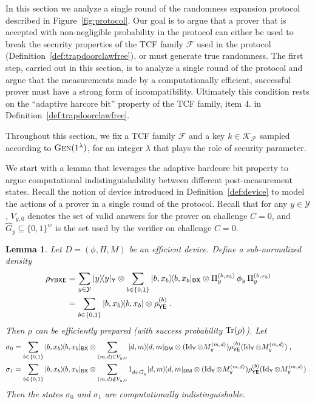 \documentclass[11pt]{article}
\newtheorem{lemma}[theorem]{Lemma}
\theoremstyle{remark}
\theoremstyle{definition}
\newcommand{\ket}[1]{|#1\rangle}
\newcommand{\bra}[1]{\langle#1|}
\newcommand{\proj}[1]{\ket{#1}\!\bra{#1}}
\newcommand{\Tr}{\mbox{\rm Tr}}
\newcommand{\Id}{\ensuremath{\mathop{\rm Id}\nolimits}}
\newcommand{\reg}[1]{{\textsf{#1}}}
\newcommand{\mF}{\ensuremath{\mathcal{F}}}
\newcommand{\mK}{\ensuremath{\mathcal{K}}}
\newcommand{\mY}{\ensuremath{\mathcal{Y}}}
\newcommand{\dset}{G}
\newcommand{\Gen}{\textsc{Gen}}
\begin{document}
In this section we analyze a single round of the randomness expansion protocol described in Figure~\ref{fig:protocol}. Our goal is to argue that a prover that is accepted with non-negligible probability in the protocol can either be used to break the security properties of the TCF family $\mathcal{F}$ used in the protocol (Definition~\ref{def:trapdoorclawfree}), or must generate true randomness. The first step, carried out in this section, is to analyze a single round of the protocol and argue that the measurements made by a computationally efficient, successful prover must have a strong form of incompatibility. Ultimately this condition rests on the ``adaptive harcore bit'' property of the TCF family, item 4. in Definition~\ref{def:trapdoorclawfree}. 

Throughout this section, we fix a TCF family $\mathcal{F}$ and a key $k\in \mK_\mF$ sampled according to $\Gen(1^\lambda)$, for an integer $\lambda$ that plays the role of security parameter. 

We start with a lemma that leverages the adaptive hardcore bit property to argue computational indistinguishability between different post-measurement states. Recall the notion of device introduced in Definition~\ref{def:device} to model the actions of a prover in a single round of the protocol. 
Recall that for any $y\in\mY$, $V_{y,0}$ denotes the set of valid answers for the prover on challenge $C=0$, and $\hat{\dset}_y\subseteq\{0,1\}^w$ is the set used by the verifier on challenge $C=0$. 

\begin{lemma} \label{lem:break}
Let $D = (\phi,\Pi,M)$ be an efficient device. Define a sub-normalized density 
\begin{align}
\rho_{\reg{YBXE}} &= \sum_{y\in\mY} \proj{y}_\reg{Y}\otimes \sum_{b\in\{0,1\}} \proj{b,x_b}_\reg{BX} \otimes \Pi_y^{(b,x_b)} \,\phi_y \,\Pi_y^{(b,x_b)}\notag\\
&=  \sum_{b\in\{0,1\}} \proj{b,x_b} \otimes \rho^{(b)}_\reg{YE}\;.\label{eq:def-sigmay}
\end{align}
Then $\rho$ can be efficiently prepared (with success probability $\Tr(\rho)$). Let
\begin{align}
\sigma_0 &=\sum_{b\in\{0,1\}} \proj{b,x_b}_{\reg{BX}} \otimes  \sum_{(m,d) \in {V}_{y,0}} \proj{d,m}_{\reg{DM}}\otimes (\Id_\reg{Y}\otimes M_y^{(m,d)}) \rho^{(b)}_{\reg{YE}} (\Id_\reg{Y}\otimes M_y^{(m,d)})\;,\notag\\
 \sigma_1 &=\sum_{b\in\{0,1\}} \proj{b,x_b}_{\reg{BX}} \otimes  \sum_{(m,d)\notin V_{y,0}} 1_{d\in \hat{\dset}_{y} } \proj{d,m}_{\reg{DM}}\otimes (\Id_\reg{Y}\otimes M_y^{(m,d)}) \rho^{(b)}_{\reg{YE}} (\Id_\reg{Y}\otimes M_y^{(m,d)})\;.\label{eq:def-rho}
\end{align}
Then the states $\sigma_0$ and $\sigma_1$ are computationally indistinguishable. 
\end{lemma}
\end{document}
